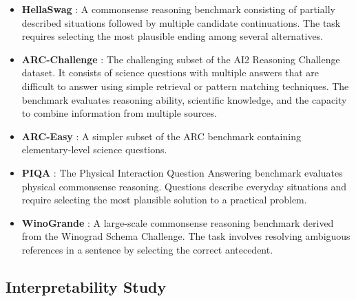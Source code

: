 \begin{itemize}
\item \textbf{HellaSwag} \cite{zellers2019hellaswag}: A commonsense reasoning benchmark consisting of 
partially described situations followed by multiple candidate continuations. The task requires 
selecting the most plausible ending among several alternatives.

\item \textbf{ARC-Challenge} \cite{clark2018arc}: The challenging subset of the AI2 Reasoning Challenge
dataset. It consists of science questions with multiple answers that are difficult to answer using simple 
retrieval or pattern matching techniques. The benchmark evaluates reasoning ability, scientific 
knowledge, and the capacity to combine information from multiple sources.

\item \textbf{ARC-Easy} \cite{clark2018arc}: A simpler subset of the ARC benchmark containing 
elementary-level science questions.

\item \textbf{PIQA} \cite{bisk2020piqa}: The Physical Interaction Question Answering benchmark 
evaluates physical commonsense reasoning. Questions describe everyday situations and require selecting 
the most plausible solution to a practical problem.

\item \textbf{WinoGrande} \cite{sakaguchi2021winogrande}: A large-scale commonsense reasoning benchmark 
derived from the Winograd Schema Challenge. The task involves resolving ambiguous references in a sentence 
by selecting the correct antecedent.

\end{itemize}

\subsection{Interpretability Study}
\label{subs:interpretability}

